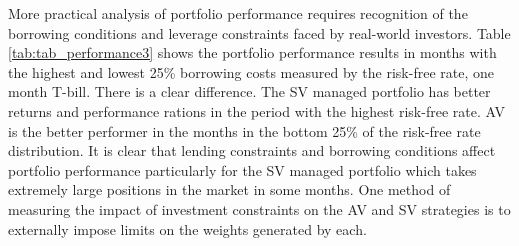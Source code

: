 More practical analysis of portfolio performance requires recognition of the borrowing conditions and leverage constraints faced by real-world investors. Table \ref{tab:tab_performance3} shows the portfolio performance results in months with the highest and lowest 25\% borrowing costs measured by the risk-free rate, one month T-bill. There is a clear difference. The SV managed portfolio has better returns and performance rations in the period with the highest risk-free rate. AV is the better performer in the months in the bottom 25\% of the risk-free rate distribution. It is clear that lending constraints and borrowing conditions affect portfolio performance particularly for the SV managed portfolio which takes extremely large positions in the market in some months. One method of measuring the impact of investment constraints on the AV and SV strategies is to externally impose limits on the weights generated by each.

